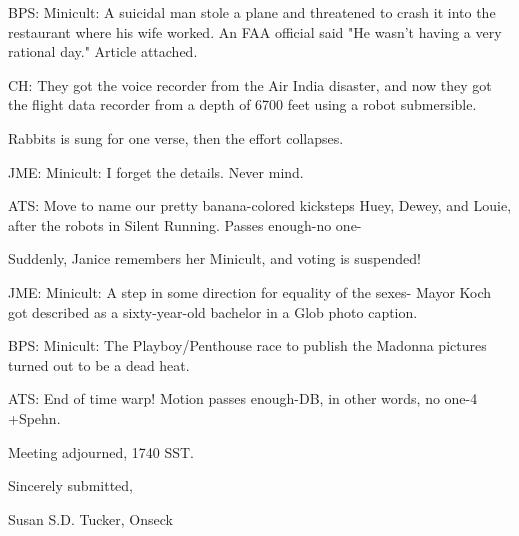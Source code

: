 \documentclass[12pt]{article}
\begin{document}
BPS: Minicult: A suicidal man stole a plane and threatened to crash it into the restaurant where his wife worked. An FAA official said "He wasn't having a very rational day." Article attached.

CH: They got the voice recorder from the Air India disaster, and now they got the flight data recorder from a depth of 6700 feet using a robot submersible.

Rabbits is sung for one verse, then the effort collapses.

JME: Minicult: I forget the details. Never mind.

ATS: Move to name our pretty banana-colored kicksteps Huey, Dewey, and Louie, after the robots in Silent Running. Passes enough-no one-

Suddenly, Janice remembers her Minicult, and voting is suspended!

JME: Minicult: A step in some direction for equality of the sexes- Mayor Koch got described as a sixty-year-old bachelor in a Glob photo caption.

BPS: Minicult: The Playboy/Penthouse race to publish the Madonna pictures turned out to be a dead heat.

ATS: End of time warp! Motion passes enough-DB, in other words, no one-4 +Spehn.

\vspace{12pt}

\noindent
Meeting adjourned, 1740 SST.

\vspace{18pt}

\centerline{Sincerely submitted,}
\centerline{Susan S.D. Tucker, Onseck}
\end{document}

